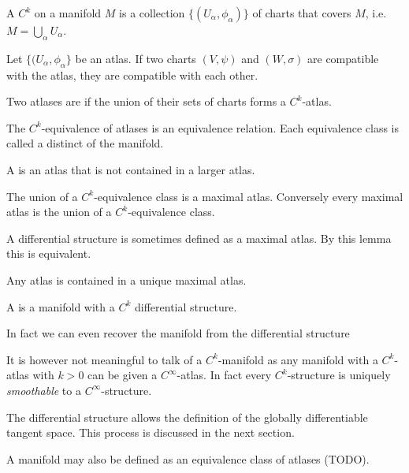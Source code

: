 \begin{definition}
A $C^k$  on a manifold $M$ is a collection  $\{(U_\alpha, \phi_\alpha)\}$ of  charts that covers $M$, i.e.\ $M=\bigcup_\alpha U_\alpha$.
\end{definition}

\begin{lemma}
Let $\{(U_\alpha, \phi_\alpha\}$ be an atlas. If two charts $(V,\psi)$ and $(W,\sigma)$ are compatible with the atlas, they are compatible with each other.
\end{lemma}

Two atlases are  if the union of their sets of charts forms a $C^k$-atlas.

\begin{lemma}
The $C^k$-equivalence of atlases is an equivalence relation. Each equivalence class is called a distinct  of the manifold.
\end{lemma}

A  is an atlas that is not contained in a larger atlas.

\begin{lemma}
The union of a $C^k$-equivalence class is a maximal atlas. Conversely every maximal atlas is the union of a $C^k$-equivalence class.
\end{lemma}
A differential structure is sometimes defined as a maximal atlas. By this lemma this is equivalent.

\begin{corollary}
Any atlas is contained in a unique maximal atlas.
\end{corollary}

\begin{definition}
A  is a manifold with a $C^k$ differential structure.
\end{definition}
In fact we can even recover the manifold from the differential structure

It is however not meaningful to talk of a $C^k$-manifold as any manifold with a $C^k$-atlas with $k>0$ can be given a $C^\infty$-atlas. In fact every $C^k$-structure is uniquely \textit{smoothable} to a $C^\infty$-structure.

The differential structure allows the definition of the globally differentiable tangent space. This process is discussed in the next section.

A manifold may also be defined as an equivalence class of atlases (TODO).

